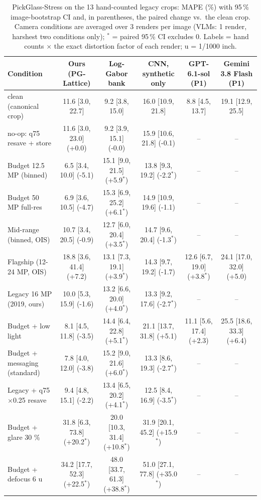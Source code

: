 \begin{table}[t]
\centering\small
\setlength{\tabcolsep}{4pt}
\caption{PickGlass-Stress on the 13 hand-counted legacy crops: MAPE (\%) with 95\,\% image-bootstrap CI and, in parentheses, the paired change vs.\ the clean crop. Camera conditions are averaged over 3 renders per image (VLMs: 1 render, harshest two conditions only); $^{*}$ = paired 95\,\% CI excludes 0. Labels = hand counts $\times$ the exact distortion factor of each render; u = 1/1000 inch.}
\label{tab:camera_stress}
\begin{tabular}{lccccc}
\toprule
Condition & Ours (PG-Lattice) & Log-Gabor bank & CNN, synthetic only & GPT-6.1-sol (P1) & Gemini 3.8 Flash (P1) \\
\midrule
clean (canonical crop) & 11.6 [3.0, 22.7] & 9.2 [3.8, 15.0] & 16.0 [10.9, 21.8] & 8.8 [4.5, 13.7] & 19.1 [12.9, 25.5] \\
no-op: q75 resave + store & 11.6 [3.0, 23.0] (+0.0) & 9.2 [3.9, 15.1] (-0.0) & 15.9 [10.6, 21.8] (-0.1) & -- & -- \\
\midrule
Budget 12.5 MP (binned) & 6.5 [3.4, 10.0] (-5.1) & 15.1 [9.0, 21.5] (+5.9$^{*}$) & 13.8 [9.3, 19.2] (-2.2$^{*}$) & -- & -- \\
Budget 50 MP full-res & 6.9 [3.6, 10.5] (-4.7) & 15.3 [6.9, 25.2] (+6.1$^{*}$) & 14.9 [10.9, 19.6] (-1.1) & -- & -- \\
Mid-range (binned, OIS) & 10.7 [3.4, 20.5] (-0.9) & 12.7 [6.0, 20.4] (+3.5$^{*}$) & 14.7 [9.6, 20.4] (-1.3$^{*}$) & -- & -- \\
Flagship (12-24 MP, OIS) & 18.8 [3.6, 41.4] (+7.2) & 13.1 [7.3, 19.1] (+3.9$^{*}$) & 14.3 [9.7, 19.2] (-1.7) & 12.6 [6.7, 19.0] (+3.8$^{*}$) & 24.1 [17.0, 32.0] (+5.0) \\
Legacy 16 MP (2019, ours) & 10.0 [5.3, 15.9] (-1.6) & 13.2 [6.6, 20.0] (+4.0$^{*}$) & 13.3 [9.2, 17.6] (-2.7$^{*}$) & -- & -- \\
\midrule
Budget + low light & 8.1 [4.5, 11.8] (-3.5) & 14.4 [6.4, 22.8] (+5.1$^{*}$) & 21.1 [13.7, 31.8] (+5.1) & 11.1 [5.6, 17.4] (+2.3) & 25.5 [18.6, 33.3] (+6.4) \\
Budget + messaging (standard) & 7.8 [4.0, 12.0] (-3.8) & 15.2 [9.0, 21.6] (+6.0$^{*}$) & 13.3 [8.6, 19.3] (-2.7$^{*}$) & -- & -- \\
Legacy + q75 $\times$0.25 resave & 9.4 [4.8, 15.1] (-2.2) & 13.4 [6.5, 20.2] (+4.1$^{*}$) & 12.5 [8.4, 16.9] (-3.5$^{*}$) & -- & -- \\
\midrule
Budget + glare 30 \% & 31.8 [6.3, 73.8] (+20.2$^{*}$) & 20.0 [10.3, 31.4] (+10.8$^{*}$) & 31.9 [20.1, 45.2] (+15.9$^{*}$) & -- & -- \\
Budget + defocus 6 u & 34.2 [17.7, 52.3] (+22.5$^{*}$) & 48.0 [33.7, 61.3] (+38.8$^{*}$) & 51.0 [27.1, 77.8] (+35.0$^{*}$) & -- & -- \\
\bottomrule
\end{tabular}
\end{table}
